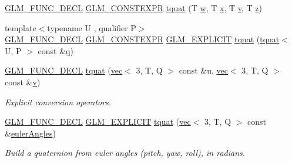 \begin{DoxyCompactItemize}
\item 
\hyperlink{setup_8hpp_ab2d052de21a70539923e9bcbf6e83a51}{G\+L\+M\+\_\+\+F\+U\+N\+C\+\_\+\+D\+E\+CL} \hyperlink{setup_8hpp_a08b807947b47031d3a511f03f89645ad}{G\+L\+M\+\_\+\+C\+O\+N\+S\+T\+E\+X\+PR} \hyperlink{structglm_1_1tquat_a8b6304133e69ca2166eb8e467c79ce71}{tquat} (T \hyperlink{_s_d_l__opengl__glext_8h_a6ee8f168a7ab6785a9bb57c6715dad99}{w}, T \hyperlink{_s_d_l__opengl_8h_ad0e63d0edcdbd3d79554076bf309fd47}{x}, T \hyperlink{_s_d_l__opengl_8h_a1675d9d7bb68e1657ff028643b4037e3}{y}, T \hyperlink{_s_d_l__opengl__glext_8h_a5e74030ebb3297ce1b37ff716fedd68f}{z})
\item 
{\footnotesize template$<$typename U , qualifier P$>$ }\\\hyperlink{setup_8hpp_ab2d052de21a70539923e9bcbf6e83a51}{G\+L\+M\+\_\+\+F\+U\+N\+C\+\_\+\+D\+E\+CL} \hyperlink{setup_8hpp_a08b807947b47031d3a511f03f89645ad}{G\+L\+M\+\_\+\+C\+O\+N\+S\+T\+E\+X\+PR} \hyperlink{setup_8hpp_a6c74f5a5e7b134ab69023ff9a30d4d5d}{G\+L\+M\+\_\+\+E\+X\+P\+L\+I\+C\+IT} \hyperlink{structglm_1_1tquat_a8d341e16c31f258a3550123eea5671f0}{tquat} (\hyperlink{structglm_1_1tquat}{tquat}$<$ U, P $>$ const \&\hyperlink{_s_d_l__opengl_8h_a8fc1e7b9baaae687804c7eed46ca09c6}{q})
\item 
\hyperlink{setup_8hpp_ab2d052de21a70539923e9bcbf6e83a51}{G\+L\+M\+\_\+\+F\+U\+N\+C\+\_\+\+D\+E\+CL} \hyperlink{structglm_1_1tquat_ad0b0aeae222fe05fb5d26fd40d74b9b6}{tquat} (\hyperlink{structglm_1_1vec}{vec}$<$ 3, T, Q $>$ const \&u, \hyperlink{structglm_1_1vec}{vec}$<$ 3, T, Q $>$ const \&\hyperlink{_s_d_l__opengl_8h_a10a82eabcb59d2fcd74acee063775f90}{v})
\begin{DoxyCompactList}\small\item\em Explicit conversion operators. \end{DoxyCompactList}\item 
\hyperlink{setup_8hpp_ab2d052de21a70539923e9bcbf6e83a51}{G\+L\+M\+\_\+\+F\+U\+N\+C\+\_\+\+D\+E\+CL} \hyperlink{setup_8hpp_a6c74f5a5e7b134ab69023ff9a30d4d5d}{G\+L\+M\+\_\+\+E\+X\+P\+L\+I\+C\+IT} \hyperlink{structglm_1_1tquat_a98289988d4e4970f9b45132f8f33759a}{tquat} (\hyperlink{structglm_1_1vec}{vec}$<$ 3, T, Q $>$ const \&\hyperlink{group__gtc__quaternion_gaf21424fa62e03de8b11c2b776c17d7a3}{euler\+Angles})
\begin{DoxyCompactList}\small\item\em Build a quaternion from euler angles (pitch, yaw, roll), in radians. \end{DoxyCompactList}\item 

\end{DoxyCompactItemize}
